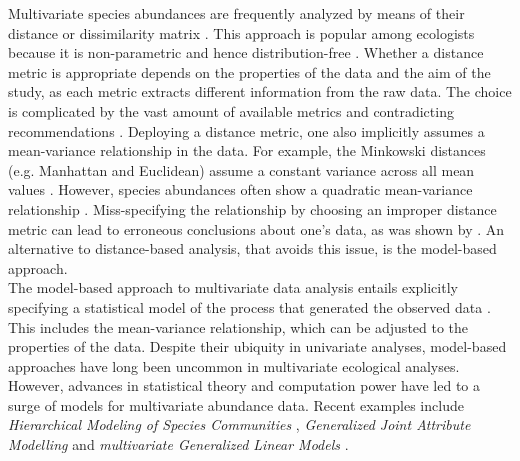 	
	Multivariate species abundances are frequently analyzed by means of their distance or dissimilarity matrix \citep[distance-based analysis \textit{sensu}][]{Warton2012}. 
	This approach is popular among ecologists because it is non-parametric and hence distribution-free \citep[e.g.][]{clarke1993non}.
	Whether a distance metric is appropriate depends on the properties of the data and the aim of the study, as each metric extracts different information from the raw data. 
	The choice is complicated by the vast amount of available metrics \citep[see][]{Legendre2012} and contradicting recommendations \citep[][]{faith1987compositional}.
	Deploying a distance metric, one also implicitly assumes a mean-variance relationship in the data. For example, the Minkowski distances (e.g. Manhattan and Euclidean) assume a constant variance across all mean values \citep{TerBraak1988}.  
	However, species abundances often show a quadratic mean-variance relationship \citep{routledge1991taylor, yamamura1999transformation}.
	Miss-specifying the relationship by choosing an improper distance metric can lead to erroneous conclusions about one's data, as was shown by \citet{Warton2012}.
	An alternative to distance-based analysis, that avoids this issue, is the model-based approach.\\ 
 


	The model-based approach to multivariate data analysis entails explicitly specifying a statistical model of the process that generated the observed data \citep{Warton2015a}.
	This includes the mean-variance relationship, which can be adjusted to the properties of the data.
	Despite their ubiquity in univariate analyses, model-based approaches have long been uncommon in multivariate ecological analyses.
    However, advances in statistical theory and computation power have led to a surge of models for multivariate abundance data. 
	Recent examples include \textit{Hierarchical Modeling of Species Communities} \citep[HMSC,][]{Ovaskainen2017}, \textit{Generalized Joint 
	Attribute Modelling} \citep[GJAM,][]{Clark2017} and \textit{multivariate Generalized Linear Models} \citep[GLM$_{mv}$,][]{Warton2012}.\\
	
	
